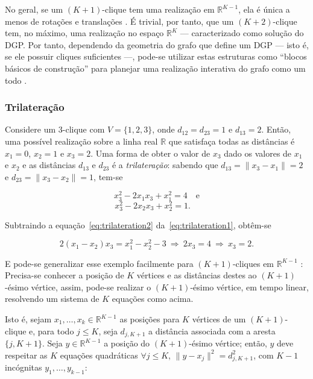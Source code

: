 No geral, se um $(K+1)$-clique tem uma realização em $\mathbb{R}^{K-1}$, ela é única a menos de rotações e translações \cite{libertiEDG}. É trivial, por tanto, que um $(K+2)$-clique tem, no máximo, uma realização no espaço $\mathbb{R}^K$ --- caracterizado como solução do DGP. Por tanto, dependendo da geometria do grafo que define um DGP --- isto é, se ele possuir cliques suficientes ---, pode-se utilizar estas estruturas como ``blocos básicos de construção'' para planejar uma realização interativa do grafo como um todo \cite{libertiEDG}.

\subsubsection{Trilateração}

Considere um 3-clique com $V = \{1,2,3\}$, onde $d_{12} = d_{23} = 1$ e $d_{13} = 2$. Então, uma possível realização sobre a linha real $\mathbb{R}$ que satisfaça todas as distâncias é $x_1 = 0$, $x_2 = 1$ e $x_3 = 2$. Uma forma de obter o valor de $x_3$ dado os valores de $x_1$ e $x_2$ e as distâncias $d_{13}$ e $d_{23}$ é a \textit{trilateração}: sabendo que $d_{13} = \lVert x_3 - x_1\rVert = 2$ e $d_{23} = \lVert x_3 - x_2 \rVert = 1$, tem-se

\begin{equation}
	x_3^2 - 2x_1x_3 +x_1^2 = 4 \quad \textrm{e}
	\label{eq:trilateration1}
\end{equation}
\begin{equation}
x_3^2 - 2x_2x_3 +x_2^2 = 1. \quad
\label{eq:trilateration2}
\end{equation}

Subtraindo a equação~\ref{eq:trilateration2} da~\ref{eq:trilateration1}, obtêm-se

\begin{equation*}
	2(x_1-x_2)x_3 = x_1^2 - x_2^2 - 3 \ \Rightarrow \ 2x_3 = 4 \ \Rightarrow \ x_3 = 2.
\end{equation*}

E pode-se generalizar esse exemplo facilmente para $(K+1)$-cliques em $\mathbb{R}^{K-1}$ \cite{libertiEDG}: Precisa-se conhecer a posição de $K$ vértices e as distâncias destes ao $(K+1)$-ésimo vértice, assim, pode-se realizar o $(K+1)$-ésimo vértice, em tempo linear, resolvendo um sistema de $K$ equações como acima.

Isto é, sejam $x_1, \dots, x_k \in \mathbb{R}^{K-1}$ as posições para $K$ vértices de um $(K+1)$-clique e, para todo $j\leq K$, seja $d_{j,K+1}$ a distância associada com a aresta $\{j, K+1\}$. Seja $y \in \mathbb{R}^{K-1}$ a posição do $(K+1)$-ésimo vértice; então, $y$ deve respeitar as $K$ equações quadráticas $\forall j\leq K$, $\lVert y-x_j\rVert^2 = d_{j,K+1}^2$, com $K-1$ incógnitas  $y_1, \dots,y_{k-1}$:

